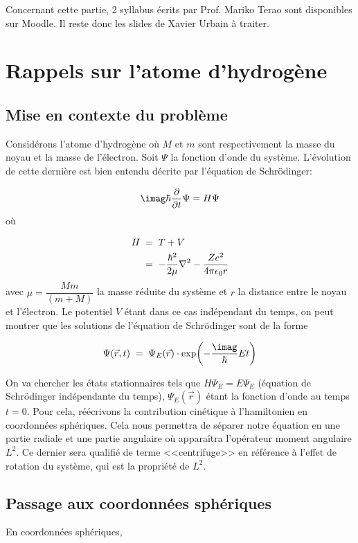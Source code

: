 ﻿Concernant cette partie, 2 syllabus écrits par Prof. Mariko Terao sont disponibles sur Moodle. Il reste donc les slides de Xavier Urbain à traiter.

\newpage
\section{Rappels sur l'atome d'hydrogène}
\subsection{Mise en contexte du problème}

Considérons l'atome d'hydrogène où $M$ et $m$ sont respectivement la masse du noyau et la masse de l'électron. Soit $\Psi$ la fonction d'onde du système. L'évolution de cette dernière est bien entendu décrite par l'équation de Schrödinger:

\[\imag\hbar \dfrac{\partial}{\partial t}\Psi=H\Psi\]
où

\begin{align}
H&\; = \; T+V \\
&\; = \; -\dfrac{\hbar^2}{2\mu}\nabla^2-\dfrac{Ze^2}{4\pi \epsilon_0 r}
\end{align}
avec $\mu=\dfrac{Mm}{(m+M)}$ la masse réduite du système et $r$ la distance entre le noyau et l'électron. Le potentiel $V$ étant dans ce cas indépendant du temps, on peut montrer que les solutions de l'équation de Schrödinger sont de la forme

\[
    \Psi(\Vec{r},t) \eq \Psi_E(\Vec{r}) \cdot \exp(-\dfrac{\imag}{\hbar}Et)
\]

On va chercher les états stationnaires tels que $H\Psi_E=E\Psi_E$ (équation de Schrödinger indépendante du temps), $\Psi_E(\Vec{r})$ étant la fonction d'onde au temps $t=0$. Pour cela, réécrivons la contribution cinétique à l'hamiltonien en coordonnées sphériques. Cela nous permettra de séparer notre équation en une partie radiale et une partie angulaire où apparaîtra l'opérateur moment angulaire $L^2$. Ce dernier sera qualifié de terme <<centrifuge>> en référence à l'effet de rotation du système, qui est la propriété de $L^2$.

\subsection{Passage aux coordonnées sphériques}
En coordonnées sphériques,

